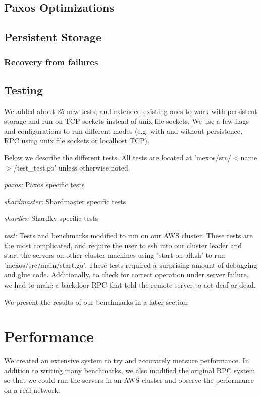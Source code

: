 \documentclass[letterpaper,10pt]{article}
\begin{document}
\subsection{Paxos Optimizations}

\subsection{Persistent Storage}

\subsubsection{Recovery from failures}

\subsection{Testing}
We added about 25 new tests, and extended existing ones to work with
persistent storage and run on TCP sockets instead of unix file
sockets. We use a few flags and configurations to run different modes
(e.g. with and without persistence, RPC using unix file sockets or
localhost TCP).

Below we describe the different tests. All tests are located at
'mexos/src/$<$name$>$/test\_test.go' unless otherwise noted.

\emph{paxos:} Paxos specific tests

\emph{shardmaster:} Shardmaster specific tests

\emph{shardkv:} Shardkv specific tests

\emph{test:} Tests and benchmarks modified to run on our AWS
cluster. These tests are the most complicated, and require the user to
ssh into our cluster leader and start the servers on other cluster
machines using 'start-on-all.sh' to run
'mexos/src/main/start.go'. These tests required a surprising amount of
debugging and glue code. Additionally, to check for correct operation
under server failure, we had to make a backdoor RPC that told the
remote server to act deaf or dead.

We present the results of our benchmarks in a later section.

\section{Performance}

We created an extensive system to try and accurately measure
performance. In addition to writing many benchmarks, we also modified
the original RPC system so that we could run the servers in an AWS
cluster and observe the performance on a real network.
\end{document}
